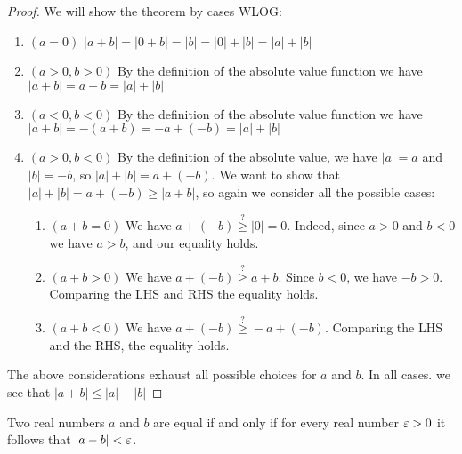 \begin{proof}
	We will show the theorem by cases WLOG:
	\begin{enumerate}
		\item $\left( a = 0 \right) $ $\left|a + b\right| = \left|0 + b\right| = \left| b\right| = \left|0\right| + \left|b\right| = \left|a\right| + \left|b\right|$
		\item $\left(a > 0, b > 0 \right)$ By the definition of the absolute value function we have  $\left|a + b\right| = a + b = \left|a\right| + \left|b\right|$
		\item $\left( a < 0, b < 0 \right)$ By the definition of the absolute value function we have $\left|a + b\right| = -\left( a+b \right) = -a + \left( -b \right) = \left|a\right| + \left|b\right|$
		\item $\left( a > 0, b < 0 \right) $ By the definition of the absolute value, we have  $\left|a\right| = a$ and $\left|b\right| = -b$, so $\left|a\right| + \left|b\right| = a + \left( -b \right) $. We want to show that $\left|a\right| + \left|b\right| = a + \left( -b \right) \ge \left|a + b\right|$, so again we consider all the possible cases:
			\begin{enumerate}
				\item $\left( a + b = 0 \right)$ We have $a + \left( -b \right) \overset{?}{\geq} \left|0\right| = 0$. Indeed, since $a>0$ and $b<0$ we have $a > b$, and our equality holds.
				\item $\left( a + b > 0 \right) $ We have $a + \left( -b \right) \overset{?}{\geq}a+b$. Since $b < 0$, we have $-b > 0$. Comparing the LHS and RHS the equality holds.
				\item $\left( a + b < 0 \right) $ We have $a + \left( -b \right)  \overset{?}{\geq} -a + \left( -b \right) $. Comparing the LHS and the RHS, the equality holds.
			\end{enumerate}
	\end{enumerate}

	The above considerations exhaust all possible choices for $a$ and $b$. In all cases. we see that $\left|a+b\right| \le \left|a\right| +\left|b\right|$
\end{proof}


\begin{theorem}
	Two real numbers $a$ and $b$ are equal if and only if for every real number $\eps > 0$ it follows that $\left|a - b\right| < \eps$.
\end{theorem}

